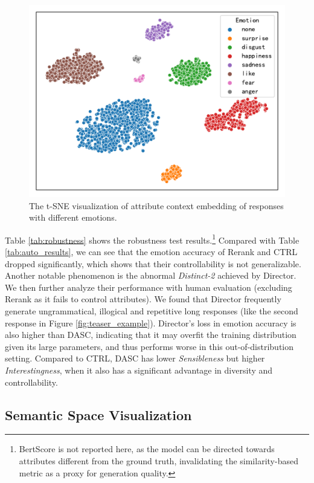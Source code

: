 \begin{figure}[t]
    \centering
    \includegraphics[width=0.9\columnwidth]{figures/emotion_context_emb.pdf}
    \caption{The t-SNE visualization of attribute context embedding of responses with different emotions.}
    \label{fig:emotion_context_emb}
\end{figure}

Table \ref{tab:robustness} shows the robustness test results.\footnote{BertScore is not reported here, as the model can be directed towards attributes different from the ground truth, invalidating the similarity-based metric as a proxy for generation quality.} Compared with Table \ref{tab:auto_results}, we can see that the emotion accuracy of Rerank and CTRL dropped significantly, which shows that their controllability is not generalizable. Another notable phenomenon is the abnormal \textit{Distinct-2} achieved by Director. We then further analyze their performance with human evaluation (excluding Rerank as it fails to control attributes). We found that Director frequently generate ungrammatical, illogical and repetitive long responses (like the second response in Figure \ref{fig:teaser_example}). Director's loss in emotion accuracy is also higher than DASC, indicating that it may overfit the training distribution given its large parameters, and thus performs worse in this out-of-distribution setting. Compared to CTRL, DASC has lower \textit{Sensibleness} but higher \textit{Interestingness}, when it also has a significant advantage in diversity and controllability. 


\subsection{Semantic Space Visualization}


